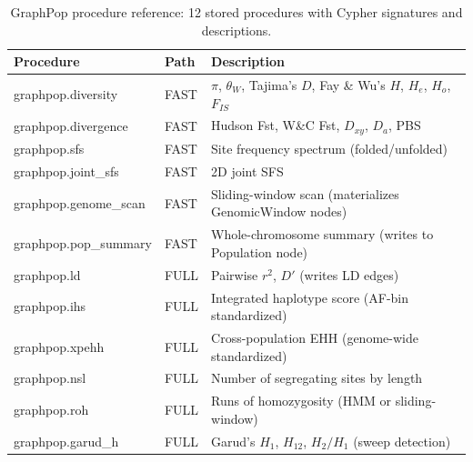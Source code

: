 \begin{table}[h]
\caption{GraphPop procedure reference: 12 stored procedures with Cypher signatures and descriptions.}
\label{tab:procedures}
\centering
\small
\begin{tabular}{p{3cm}p{2cm}p{8cm}}
\toprule
Procedure & Path & Description \\
\midrule
graphpop.diversity & FAST & $\pi$, $\theta_W$, Tajima's $D$, Fay \& Wu's $H$, $H_e$, $H_o$, $F_{IS}$ \\
graphpop.divergence & FAST & Hudson Fst, W\&C Fst, $D_{xy}$, $D_a$, PBS \\
graphpop.sfs & FAST & Site frequency spectrum (folded/unfolded) \\
graphpop.joint\_sfs & FAST & 2D joint SFS \\
graphpop.genome\_scan & FAST & Sliding-window scan (materializes GenomicWindow nodes) \\
graphpop.pop\_summary & FAST & Whole-chromosome summary (writes to Population node) \\
graphpop.ld & FULL & Pairwise $r^2$, $D'$ (writes LD edges) \\
graphpop.ihs & FULL & Integrated haplotype score (AF-bin standardized) \\
graphpop.xpehh & FULL & Cross-population EHH (genome-wide standardized) \\
graphpop.nsl & FULL & Number of segregating sites by length \\
graphpop.roh & FULL & Runs of homozygosity (HMM or sliding-window) \\
graphpop.garud\_h & FULL & Garud's $H_1$, $H_{12}$, $H_2/H_1$ (sweep detection) \\
\bottomrule
\end{tabular}
\end{table}
